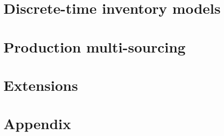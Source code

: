 
\cleardoublepage
\part{Discrete-time inventory models}
\label{part:production planning}





\cleardoublepage
\part{Production multi-sourcing}
\label{part:multi-sourcing}





\cleardoublepage
\part{Extensions}
\label{part:extensions}


 


\cleardoublepage
{}






\cleardoublepage
{}




\appendix


\cleardoublepage
\part*{Appendix}
\label{part:appendix}





